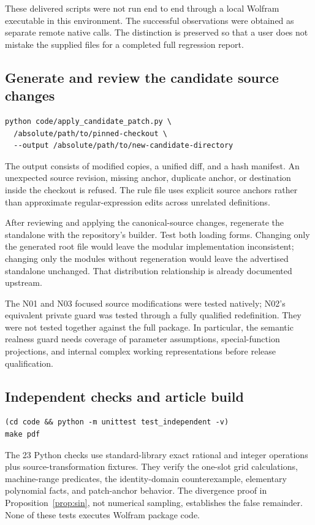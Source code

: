 \documentclass[11pt,a4paper]{article}
\begin{document}
These delivered scripts were not run end to end through a local Wolfram executable in this environment. The successful observations were obtained as separate remote native calls. The distinction is preserved so that a user does not mistake the supplied files for a completed full regression report.

\subsection{Generate and review the candidate source changes}
\begin{lstlisting}
python code/apply_candidate_patch.py \
  /absolute/path/to/pinned-checkout \
  --output /absolute/path/to/new-candidate-directory
\end{lstlisting}
The output consists of modified copies, a unified diff, and a hash manifest. An unexpected source revision, missing anchor, duplicate anchor, or destination inside the checkout is refused. The rule file uses explicit source anchors rather than approximate regular-expression edits across unrelated definitions.

After reviewing and applying the canonical-source changes, regenerate the standalone with the repository's builder. Test both loading forms. Changing only the generated root file would leave the modular implementation inconsistent; changing only the modules without regeneration would leave the advertised standalone unchanged. That distribution relationship is already documented upstream.\cite{repo-readme}

The N01 and N03 focused source modifications were tested natively; N02's equivalent private guard was tested through a fully qualified redefinition. They were not tested together against the full package. In particular, the semantic realness guard needs coverage of parameter assumptions, special-function projections, and internal complex working representations before release qualification.

\subsection{Independent checks and article build}
\begin{lstlisting}
(cd code && python -m unittest test_independent -v)
make pdf
\end{lstlisting}
The 23 Python checks use standard-library exact rational and integer operations plus source-transformation fixtures. They verify the one-slot grid calculations, machine-range predicates, the identity-domain counterexample, elementary polynomial facts, and patch-anchor behavior. The divergence proof in Proposition~\ref{prop:sin}, not numerical sampling, establishes the false remainder. None of these tests executes Wolfram package code.
\end{document}
